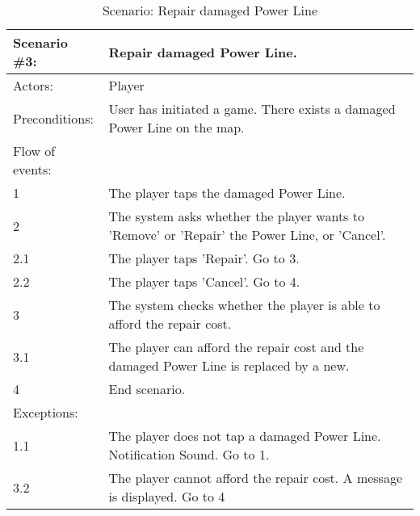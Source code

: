 \begin{table}
	\begin{tabular}{| l | p{10cm} |}
		\hline
		\rowcolor{lightgray}
		{\bf Scenario \#3:} & {\bf Repair damaged Power Line.} \\ \hline
		Actors: & Player \\ \hline
		Preconditions: & User has initiated a game. There exists a damaged Power Line on the map. \\ \hline
		\rowcolor{lightergray}
		Flow of events: & \\ \hline
		1 & The player taps the damaged Power Line. \\ \hline
		2 & The system asks whether the player wants to 'Remove' or 'Repair' the Power Line, or 'Cancel'. \\ \hline
		2.1 & The player taps 'Repair'. Go to 3. \\ \hline
		2.2 & The player taps 'Cancel'. Go to 4. \\ \hline
		3 & The system checks whether the player is able to afford the repair cost. \\ \hline
		3.1 & The player can afford the repair cost and the damaged Power Line is replaced by a new. \\ \hline
		4 & End scenario. \\ \hline
		\rowcolor{lightergray}
		Exceptions: & \\ \hline
		1.1 & The player does not tap a damaged Power Line. Notification Sound. Go to 1. \\ \hline
		3.2 & The player cannot afford the repair cost. A message is displayed. Go to 4 \\ \hline
	\end{tabular}
\caption{Scenario: Repair damaged Power Line}
\end{table}


